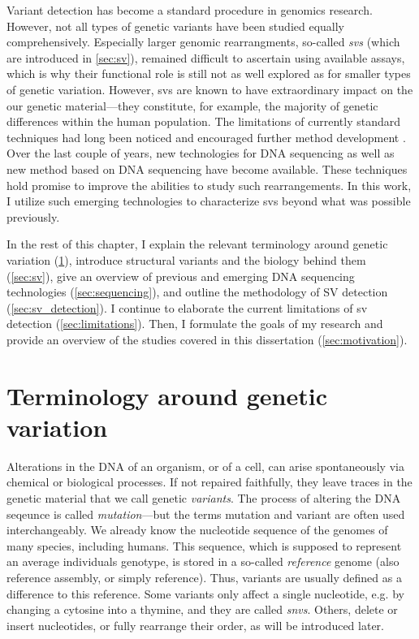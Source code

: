 Variant detection has become a standard procedure in genomics research. However,
not all types of genetic variants have been studied equally comprehensively.
Especially larger genomic rearrangments, so-called \emph{\aclp{sv}} (which are
introduced in \cref{sec:sv}), remained
difficult to ascertain using available assays, which is why their functional
role is still not as well explored as for smaller types of genetic variation.
However, \aclp{sv} are known to have extraordinary impact on the our genetic
material---they constitute, for example, the majority of genetic
differences within the human population.
The limitations of currently standard techniques had long been noticed and
encouraged further method development \citep{Onishi-Seebacher2011}. Over the
last couple of years, new technologies for DNA sequencing as well as new method
based on DNA sequencing have become available. These techniques hold promise to
improve the abilities to study such rearrangements. In this work, I utilize such
emerging technologies to characterize \aclp{sv} beyond what was possible previously.

In the rest of this chapter, I explain the relevant terminology around genetic
variation (\cref{sec:variation}), introduce structural variants and the biology
behind them (\cref{sec:sv}), give an overview of previous and emerging DNA
sequencing technologies (\cref{sec:sequencing}), and outline the methodology
of SV detection (\cref{sec:sv_detection}). I continue to elaborate the current
limitations of \acl{sv} detection (\cref{sec:limitations}). Then, I formulate
the goals of my research and provide an overview of the studies covered in this
dissertation (\cref{sec:motivation}).






\section{Terminology around genetic variation}
\label{sec:variation}

Alterations in the DNA of an organism, or of a cell, can arise spontaneously
via chemical or biological processes. If not repaired faithfully, they leave
traces in the genetic material that we call genetic \emph{variants}. The process
of altering the DNA seqeunce is called \emph{mutation}---but the terms mutation
and variant are often used interchangeably.
We already know the nucleotide sequence of the genomes of many species,
including humans. This sequence, which is supposed to represent an average
individuals genotype, is stored in a so-called \emph{reference} genome (also
reference assembly, or simply reference).
Thus, variants are usually defined as a difference to this reference. Some
variants only affect a single nucleotide, e.g. by changing a cytosine into a
thymine, and they are called \emph{\acfp{snv}}. Others, delete or insert
nucleotides, or fully rearrange their order, as will be introduced later.

